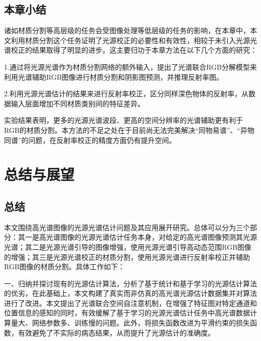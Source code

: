 \documentclass[
    type = master, %
    degree = academic,        %
    decl-page,  %
  ]{njuthesis}
\begin{document}
\section{本章小结}
诸如材质分割等高层级的任务会受图像处理等低层级的任务的影响，在本章中，本文利用材质分割这个任务证明了光源校正的必要性和有效性，相较于未引入光源光谱校正的结果取得了明显的进步。这主要归功于本章方法在以下几个方面的研究：

1.通过将光源光谱作为材质分割网络的额外输入，提出了光谱联合RGB分解模型来利用光谱辅助RGB图像进行材质分割和阴影图预测，并推理反射率图。

2.利用光源光谱估计的结果来进行反射率校正，区分同样深色物体的反射率，从数据输入层面增加不同材质类别间的特征差异。

实验结果表明，更多的光源光谱波段、更高的空间分辨率的光谱辅助更有利于RGB的材质分割。本方法的不足之处在于目前尚无法完美解决“同物易谱”、“异物同谱”的问题，在反射率校正的精度方面仍有提升空间。

\chapter{总结与展望}
\section{总结}
本文围绕高光谱图像的光源光谱估计问题及其应用展开研究。总体可以分为三个部分：其一是高光谱图像的光源光谱估计任务本身，对给定的高光谱图像预测其光源光谱；其二是光源光谱引导的图像增强，使用光源光谱引导高动态范围RGB图像的增强；其三是光源光谱校正的材质分割，使用光源光谱进行反射率校正并辅助RGB图像的材质分割。具体工作如下：

一、归纳并探讨现有的光源估计算法，分析了基于统计和基于学习的光源估计算法的优劣，在此基础上，本文构建了真实而非仿真的高光谱光源估计数据集并对算法进行了改进。本文提出了光谱联合空间自注意机制，在增强了特征图对特定通道和位置信息的感知的同时，有效缓解了基于学习的光源光谱估计任务中高光谱数据计算量大、网络参数多、训练慢的问题。此外，将损失函数改进为平滑约束的损失函数，有效避免了不实际的病态结果，从而提升了光源估计的准确度。
\end{document}
